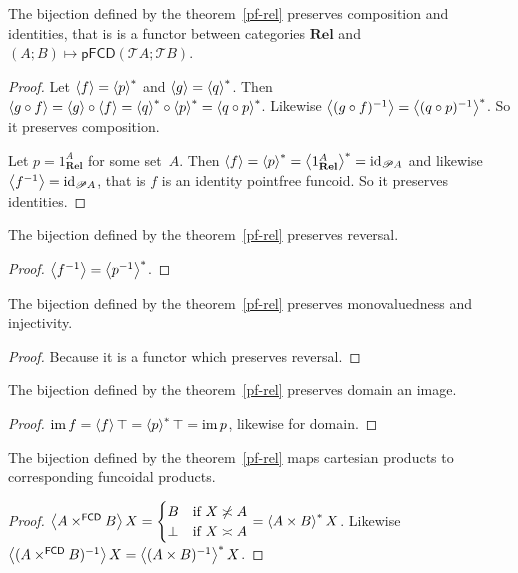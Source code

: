 \begin{prop}
The bijection defined by the theorem~\ref{pf-rel} preserves composition
and identities, that is is a functor between categories $\mathbf{Rel}$
and $(A;B)\mapsto\mathsf{pFCD}(\mathscr{T}A;\mathscr{T}B)$.\end{prop}
\begin{proof}
Let $\left\langle f\right\rangle=\left\langle p\right\rangle ^{\ast}$ and $\left\langle g\right\rangle=\left\langle q\right\rangle ^{\ast}$. Then $\left\langle g\circ f\right\rangle=\left\langle g\right\rangle\circ\left\langle f\right\rangle=\left\langle q\right\rangle ^{\ast}\circ\left\langle p\right\rangle ^{\ast}=\left\langle q\circ p\right\rangle ^{\ast}$.
Likewise $\left\langle (g\circ f)^{-1}\right\rangle=\left\langle (q\circ p)^{-1}\right\rangle ^{\ast}$. So
it preserves composition.

Let $p=1_{\mathbf{Rel}}^{A}$ for some set~$A$. Then $\left\langle f\right\rangle=\left\langle p\right\rangle ^{\ast}=\left\langle 1_{\mathbf{Rel}}^{A}\right\rangle ^{\ast}=\operatorname{id}_{\mathscr{P} A}$
and likewise $\left\langle f^{-1}\right\rangle=\operatorname{id}_{\mathscr{P} A}$, that is $f$ is
an identity pointfree funcoid. So it preserves identities.\end{proof}
\begin{prop}
The bijection defined by the theorem~\ref{pf-rel} preserves reversal.\end{prop}
\begin{proof}
$\left\langle f^{-1}\right\rangle=\left\langle p^{-1}\right\rangle ^{\ast}$.\end{proof}
\begin{prop}
The bijection defined by the theorem~\ref{pf-rel} preserves monovaluedness
and injectivity.\end{prop}
\begin{proof}
Because it is a functor which preserves reversal.\end{proof}
\begin{prop}
The bijection defined by the theorem~\ref{pf-rel} preserves domain
an image.\end{prop}
\begin{proof}
$\operatorname{im} f=\left\langle f\right\rangle\top=\left\langle p\right\rangle ^{\ast}\top=\operatorname{im} p$, likewise for domain.\end{proof}
\begin{prop}
The bijection defined by the theorem~\ref{pf-rel} maps cartesian
products to corresponding funcoidal products.\end{prop}
\begin{proof}
$\left\langle A\times^{\mathsf{FCD}}B\right\rangle X=\begin{cases}
B & \text{if }X\not\asymp A\\
\bot & \text{if }X\asymp A
\end{cases}=\left\langle A\times B\right\rangle ^{\ast}X$. Likewise $\left\langle (A\times^{\mathsf{FCD}}B)^{-1}\right\rangle X=\left\langle (A\times B)^{-1}\right\rangle ^{\ast}X$.\end{proof}

